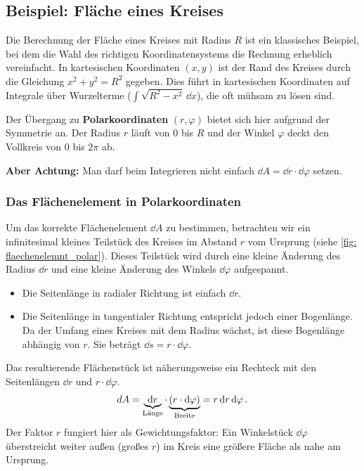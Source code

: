 \subsection{Beispiel: Fläche eines Kreises}\label{subsec: flaeche_kreis}
Die Berechnung der Fläche eines Kreises mit Radius $R$ ist ein klassisches Beispiel, bei dem die Wahl des richtigen Koordinatensystems die Rechnung erheblich vereinfacht.
In kartesischen Koordinaten $(x,y)$ ist der Rand des Kreises durch die Gleichung $x^2 + y^2 = R^2$ gegeben. Dies führt in kartesischen Koordinaten auf Integrale über Wurzelterme ($\int \sqrt{R^2-x^2} \, \dd x$), die oft mühsam zu lösen sind.

Der Übergang zu \textbf{Polarkoordinaten} $(r, \varphi)$ bietet sich hier aufgrund der Symmetrie an.
Der Radius $r$ läuft von $0$ bis $R$ und der Winkel $\varphi$ deckt den Vollkreis von $0$ bis $2\pi$ ab.

\noindent \textbf{Aber Achtung:} Man darf beim Integrieren nicht einfach $\dd A = \dd r \cdot \dd \varphi$ setzen.

\subsubsection*{Das Flächenelement in Polarkoordinaten}
Um das korrekte Flächenelement $\dd A$ zu bestimmen, betrachten wir ein infinitesimal kleines Teilstück des Kreises im Abstand $r$ vom Ursprung (siehe \cref{fig: flaechenelemnt_polar}).
Dieses Teilstück wird durch eine kleine Änderung des Radius $\dd r$ und eine kleine Änderung des Winkels $\dd \varphi$ aufgespannt.
\begin{itemize}
    \item Die Seitenlänge in radialer Richtung ist einfach $\dd r$.
    \item Die Seitenlänge in tangentialer Richtung entspricht jedoch einer Bogenlänge. Da der Umfang eines Kreises mit dem Radius wächst, ist diese Bogenlänge abhängig von $r$. Sie beträgt $\dd s = r \cdot \dd \varphi$.
\end{itemize}
Das resultierende Flächenstück ist näherungsweise ein Rechteck mit den Seitenlängen $\dd r$ und $r \cdot \dd \varphi$.
\begin{equation}\label{eq: flaechenelement_polar}
    dA = \underbrace{\mathrm{d} r}_{\text{Länge}} \cdot \underbrace{(r \cdot \mathrm{d} \varphi)}_{\text{Breite}} = r \, \mathrm{d} r \, \mathrm{d} \varphi \,.
\end{equation}
Der Faktor $r$ fungiert hier als Gewichtungsfaktor: Ein Winkelstück $\dd \varphi$ überstreicht weiter außen (großes $r$) im Kreis eine größere Fläche als nahe am Ursprung.


